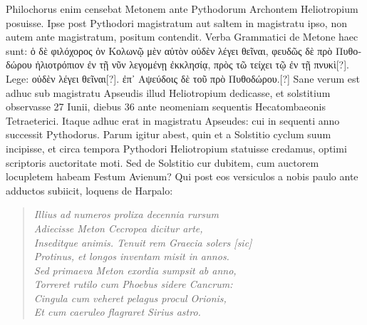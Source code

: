 Philochorus enim
censebat Metonem ante Pythodorum Archontem Heliotropium
posuisse.
Ipse post Pythodori magistratum aut saltem in magistratu
ipso, non autem ante magistratum, positum contendit.
Verba
Grammatici de Metone haec sunt: \textgreek{ὁ δὲ φιλόχορος ὀν Κολωνῷ μὲν
αὐτὸν οὐδὲν λέγει θεῖναι, φευδῶς δὲ πρὸ Πυθοδώρου ἡλιοτρόπιον ἐν τῇ νῦν
λεγομένῃ ἐκκλησίᾳ, πρὸς τῶ τείχει τῷ ἐν τῇ πνυκὶ[?]}.
Lege: \textgreek{οὐδὲν λέγει
θεῖναι[?]}.
\textgreek{ἐπ᾽ Αψεύδοις δὲ τοῦ πρὸ Πυθοδώρου.[?]}
Sane verum est adhuc
sub magistratu Apseudis illud Heliotropium dedicasse, et solstitium
observasse 27 Iunii, diebus 36 ante neomeniam sequentis Hecatombaeonis
Tetraeterici.
%
Itaque adhuc erat in magistratu Apseudes:
cui in sequenti anno successit Pythodorus.
Parum igitur abest,
quin et a Solstitio cyclum suum incipisse, et circa tempora Pythodori
Heliotropium statuisse credamus, optimi scriptoris auctoritate
moti.
Sed de Solstitio cur dubitem, cum auctorem locupletem
habeam Festum Avienum?
Qui post eos versiculos a nobis paulo
ante adductos subiicit, loquens de Harpalo:
\begin{verse}
  \textit{Illius ad numeros prolixa decennia rursum}\\
  \textit{Adiecisse Meton Cecropea dicitur arte,}\\
  \textit{Inseditque animis. Tenuit rem Graecia solers [sic]}\\
  \textit{Protinus, et longos inventam misit in annos.}\\
  \textit{Sed primaeva Meton exordia sumpsit ab anno,}\\
  \textit{Torreret rutilo cum Phoebus sidere Cancrum:}\\
  \textit{Cingula cum veheret pelagus procul Orionis,}\\
  \textit{Et cum caeruleo flagraret Sirius astro.}\\
\end{verse}
